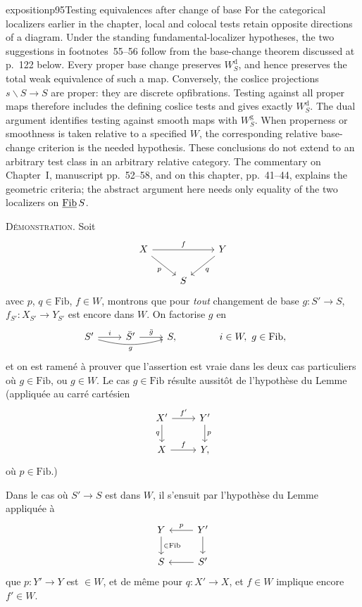 \begin{dcomment}{exposition}{p95}{Testing equivalences after change of base}
For the categorical localizers earlier in the chapter, local and colocal tests retain opposite directions of a diagram. Under the standing fundamental-localizer hypotheses, the two suggestions in footnotes~55--56 follow from the base-change theorem discussed at p.~122 below. Every proper base change preserves $W_S^{\mathrm d}$, and hence preserves the total weak equivalence of such a map. Conversely, the coslice projections $s\backslash S\to S$ are proper: they are discrete opfibrations. Testing against all proper maps therefore includes the defining coslice tests and gives exactly $W_S^{\mathrm d}$. The dual argument identifies testing against smooth maps with $W_S^{\mathrm g}$. When properness or smoothness is taken relative to a specified $W$, the corresponding relative base-change criterion is the needed hypothesis. These conclusions do not extend to an arbitrary test class in an arbitrary relative category. The commentary on Chapter~I, manuscript pp.~52--58, and on this chapter, pp.~41--44, explains the geometric criteria; the abstract argument here needs only equality of the two localizers on $\underline{\mathrm{Fib}}\, S$.
\end{dcomment}


\textsc{Démonstration}. Soit
\[
\begin{tikzcd}
X \arrow[rr, "f"] \arrow[dr, "p"'] & & Y \arrow[dl, "q"] \\
& S &
\end{tikzcd}
\]
avec $p$, $q \in \mathrm{Fib}$, $f \in W$, montrons que pour \textit{tout} changement de base $g : S' \longrightarrow S$, $f_{S'} : X_{S'} \longrightarrow Y_{S'}$ est encore dans $W$. On factorise $g$ en
\[
\begin{tikzcd}
S' \arrow[r, "i"] \arrow[rr, bend right=15, "g"'] & \bar{S}' \arrow[r, "\bar{g}"] & S,
\end{tikzcd}
\qquad\qquad i \in W,\ g \in \mathrm{Fib},
\]
 et on est ramené à prouver que l'assertion est vraie dans les deux cas particuliers où $g \in \mathrm{Fib}$, ou $g \in W$. Le cas $g \in \mathrm{Fib}$ résulte aussitôt de l'hypothèse du Lemme (appliquée au carré cartésien
\[
\begin{tikzcd}
X' \arrow[r, "f'"] \arrow[d, "q"'] & Y' \arrow[d, "p"] \\
X \arrow[r, "f"] & Y,
\end{tikzcd}
\]
où $p \in \mathrm{Fib}$.)

Dans le cas où $S' \longrightarrow S$ est dans $W$, il s'ensuit par l'hypothèse du Lemme appliquée à
\[
\begin{tikzcd}
Y \arrow[d, "\in\mathrm{Fib}"] & Y' \arrow[l, "p"'] \arrow[d] \\
S & S' \arrow[l]
\end{tikzcd}
\]
que  $p : Y' \longrightarrow Y$ est $\in W$, et de même pour $q : X' \longrightarrow X$, et $f \in W$ implique encore $f' \in W$.

